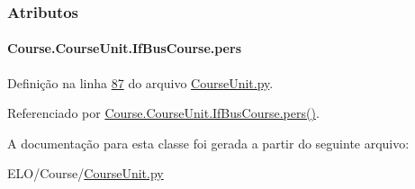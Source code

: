 \subsubsection{Atributos}
\hypertarget{classCourse_1_1CourseUnit_1_1IfBusCourse_ab926ae8fb127b7697e2b63025df09a78}{}
\paragraph[{pers}]{\setlength{\rightskip}{0pt plus 5cm}Course.\+Course\+Unit.\+If\+Bus\+Course.\+pers}\label{classCourse_1_1CourseUnit_1_1IfBusCourse_ab926ae8fb127b7697e2b63025df09a78}


Definição na linha \hyperlink{CourseUnit_8py_source_l00087}{87} do arquivo \hyperlink{CourseUnit_8py_source}{Course\+Unit.\+py}.



Referenciado por \hyperlink{classCourse_1_1CourseUnit_1_1IfBusCourse_a7942e9a93e317a21a876f1c0ee851c0d}{Course.\+Course\+Unit.\+If\+Bus\+Course.\+pers()}.



A documentação para esta classe foi gerada a partir do seguinte arquivo\+:\begin{DoxyCompactItemize}
\item 
E\+L\+O/\+Course/\hyperlink{CourseUnit_8py}{Course\+Unit.\+py}\end{DoxyCompactItemize}
